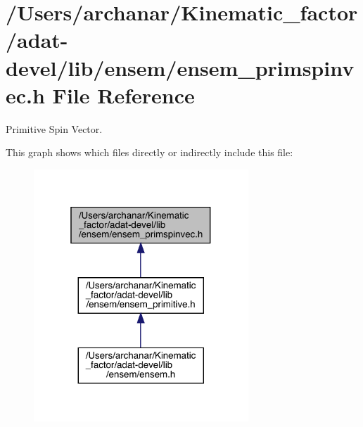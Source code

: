\hypertarget{adat-devel_2lib_2ensem_2ensem__primspinvec_8h}{}\section{/\+Users/archanar/\+Kinematic\+\_\+factor/adat-\/devel/lib/ensem/ensem\+\_\+primspinvec.h File Reference}
\label{adat-devel_2lib_2ensem_2ensem__primspinvec_8h}


Primitive Spin Vector.  


This graph shows which files directly or indirectly include this file\+:
\nopagebreak
\begin{figure}[H]
\begin{center}
\leavevmode
\includegraphics[width=229pt]{d8/d84/adat-devel_2lib_2ensem_2ensem__primspinvec_8h__dep__incl}
\end{center}
\end{figure}

